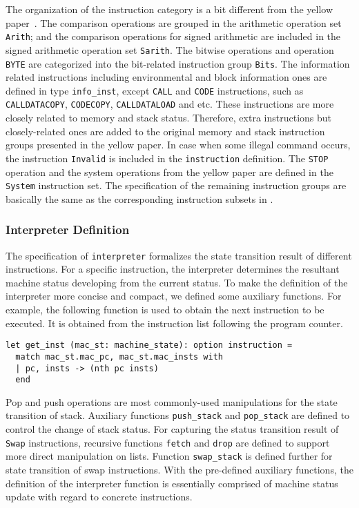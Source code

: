 \documentclass[runningheads]{llncs}
\begin{document}
The organization of the instruction category is a bit different from the yellow paper~\cite{wood2014ethereum}. The comparison operations are grouped in the arithmetic operation set \texttt{Arith}; and the comparison operations for signed arithmetic are included in the signed arithmetic operation set \texttt{Sarith}. The bitwise operations and operation \texttt{BYTE} are categorized into the bit-related instruction group \texttt{Bits}. The information related instructions including environmental and block information ones are defined in type \texttt{info\_inst}, except \texttt{CALL} and \texttt{CODE} instructions, such as \texttt{CALLDATACOPY}, \texttt{CODECOPY}, \texttt{CALLDATALOAD} and etc. These instructions are more closely related to memory and stack status. Therefore, extra instructions but closely-related ones are added to the original memory and stack instruction groups presented in the yellow paper. In case when some illegal command occurs, the instruction \texttt{Invalid} is included in the \texttt{instruction} definition. The \texttt{STOP} operation and the system operations from the yellow paper are defined in the \texttt{System} instruction set. The specification of the remaining instruction groups are basically the same as the corresponding instruction subsets in \cite{wood2014ethereum}. 

\subsubsection{Interpreter Definition}\label{sec:interpreter}
The specification of \texttt{interpreter} formalizes the state transition result of different instructions. For a specific instruction, the interpreter determines the resultant machine status developing from the current status.
To make the definition of the interpreter more concise and compact, we defined some auxiliary functions. For example, the following function is used to obtain the next instruction to be executed. It is obtained from the instruction list following the program counter. 
\begin{verbatim}
let get_inst (mac_st: machine_state): option instruction =
  match mac_st.mac_pc, mac_st.mac_insts with 
  | pc, insts -> (nth pc insts) 
  end    
\end{verbatim}

Pop and push operations are most commonly-used manipulations for the state transition of stack. Auxiliary functions \texttt{push\_stack} and \texttt{pop\_stack} are defined to control the change of stack status. For capturing the status transition result of \texttt{Swap} instructions, recursive functions \texttt{fetch} and \texttt{drop} are defined to support more direct manipulation on lists. Function \texttt{swap\_stack} is defined further for state transition of swap instructions.
With the pre-defined auxiliary functions, the definition of the interpreter function is essentially comprised of machine status update with regard to concrete instructions. 
\end{document}
